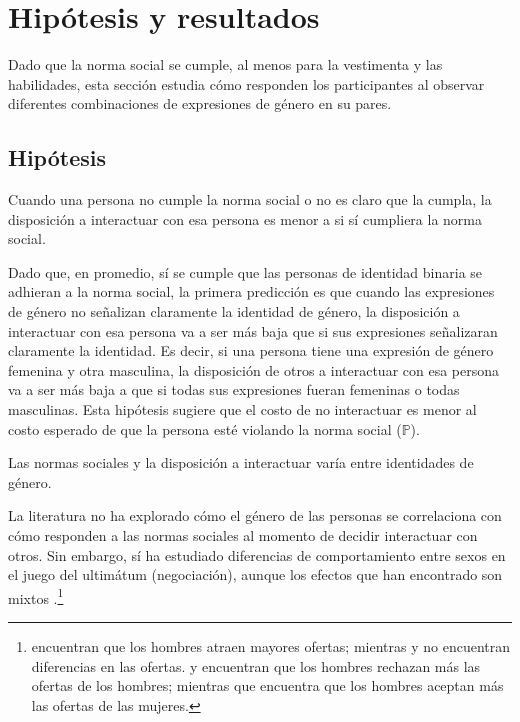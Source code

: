 \section{Hipótesis y resultados}
Dado que la norma social se cumple, al menos para la vestimenta y las habilidades, esta sección estudia cómo responden los participantes al observar diferentes combinaciones de expresiones de género en su pares.

\subsection{Hipótesis}
\begin{hyp}
Cuando una persona no cumple la norma social o no es claro que la cumpla, la disposición a interactuar con esa persona es menor a si sí cumpliera la norma social. 
\end{hyp}

Dado que, en promedio, sí se cumple que las personas de identidad binaria se adhieran a la norma social, la primera predicción es que cuando las expresiones de género no señalizan claramente la identidad de género, la disposición a interactuar con esa persona va a ser más baja que si sus expresiones señalizaran claramente la identidad. Es decir, si una persona tiene una expresión de género femenina y otra masculina, la disposición de otros a interactuar con esa persona va a ser más baja a que si todas sus expresiones fueran femeninas o todas masculinas. Esta hipótesis sugiere que el costo de no interactuar es menor al costo esperado de que la persona esté violando la norma social ($\mathbb{P}$). 

\begin{hyp}
Las normas sociales y la disposición a interactuar varía entre identidades de género.
\end{hyp}

La literatura no ha explorado cómo el género de las personas se correlaciona con cómo responden a las normas sociales al momento de decidir interactuar con otros. Sin embargo, sí ha estudiado diferencias de comportamiento entre sexos en el juego del ultimátum (negociación), aunque los efectos que han encontrado son mixtos \citep{solnick2001genderultimatumgame, eckel2001chivalryultimatumgame, gomez2018gendernegociacion}.\footnote{\cite{solnick2001genderultimatumgame} encuentran que los hombres atraen mayores ofertas; mientras \cite{eckel2001chivalryultimatumgame} y \cite{gomez2018gendernegociacion} no encuentran diferencias en las ofertas. \cite{solnick2001genderultimatumgame} y \cite{gomez2018gendernegociacion} encuentran que los hombres rechazan más las ofertas de los hombres; mientras que \cite{eckel2001chivalryultimatumgame} encuentra que los hombres aceptan más las ofertas de las mujeres.} 

